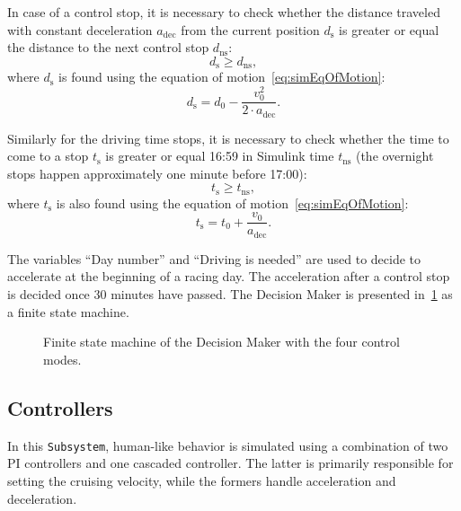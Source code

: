 In case of a control stop, it is necessary to check whether the distance traveled with constant deceleration $a_\mathrm{dec}$ from the current position $d_\mathrm{s}$ is greater or equal the distance to the next control stop $d_\mathrm{ns}$:
\begin{equation}
	d_\mathrm{s} \geq d_\mathrm{ns},
\end{equation}
where $d_\mathrm{s}$ is found using the equation of motion~\cref{eq:simEqOfMotion}:
\begin{equation}
	d_\mathrm{s} = d_0 - \frac{v_0^2}{2 \cdot a_\mathrm{dec}}.
\end{equation}

Similarly for the driving time stops, it is necessary to check whether the time to come to a stop $t_\mathrm{s}$ is greater or equal 16:59 in Simulink time $t_\mathrm{ns}$ (the overnight stops happen approximately one minute before 17:00):
\begin{equation}
	t_\mathrm{s} \geq t_\mathrm{ns},
\end{equation}
where $t_\mathrm{s}$ is also found using the equation of motion~\cref{eq:simEqOfMotion}:
\begin{equation}
	t_\mathrm{s} = t_0 + \frac{v_0}{a_\mathrm{dec}}.
\end{equation}

The variables \enquote{Day number} and \enquote{Driving is needed} are used to decide to accelerate at the beginning of a racing day. The acceleration after a control stop is decided once 30 minutes have passed. The Decision Maker is presented in~\cref{fig:simStateMachine} as a finite state machine.
\begin{figure}[htbp]
	\centering
	
	\caption{Finite state machine of the Decision Maker with the four control modes.}
	\label{fig:simStateMachine}
\end{figure}
%	


\subsection{Controllers}
\label{sec:simDriverControllers}
In this \texttt{Subsystem}, human-like behavior is simulated using a combination of two PI controllers and one cascaded controller. The latter is primarily responsible for setting the cruising velocity, while the formers handle acceleration and deceleration.

